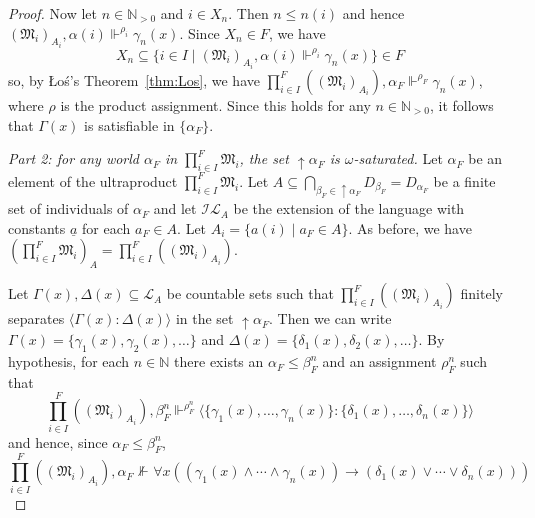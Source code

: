 \documentclass[submission,copyright,creativecommons]{eptcs}
\newcommand{\mo}{\mathfrak}
\newcommand{\IL}{\mathscr{I\!\!L}}   %
\newcommand{\LL}{\mathcal{L}}        %
\newcommand{\consec}[2]{\langle #1:#2 \rangle}
\newcommand{\satisfySym}{\Vdash}
\newcommand{\satisfy}[4]{#1, #2 \satisfySym^{#4} #3}
\newcommand{\notsatisfy}[4]{#1, #2 \not\Vdash^{#4} #3}
\begin{document}
\begin{proof}
  Now let $n \in \mathbb{N}_{>0}$ and $i \in X_n$. 
  Then $n \leq n(i)$ and hence
  $\satisfy{(\mo{M}_i)_{A_i}}{\alpha(i)}{\gamma_n(x)}{\rho_i}$. Since $X_n \in F$, we have 
  \begin{equation*}
    X_n \subseteq \{ i \in I \mid \satisfy{(\mo{M}_i)_{A_i}}{\alpha(i)}{\gamma_n(x)}{\rho_i} \}
        \in F
  \end{equation*}
  so, by \L{}o{\'s}'s Theorem~\ref{thm:Los}, we have
  $\satisfy{\prod_{i \in I}^F((\mo{M}_i)_{A_i})}{\alpha_F}{\gamma_n(x)}{\rho_F}$,
  where $\rho$ is the product assignment.
  Since this holds for any $n \in \mathbb{N}_{>0}$,
  it follows that $\Gamma(x)$ is satisfiable in $\{\alpha_F\}$.

\medskip\noindent
\textit{Part 2: for any world $\alpha_F$ in $\prod_{i \in I}^F\mo{M}_i$,
        the set ${\uparrow}\alpha_F$ is $\omega$-saturated.}
%
  Let $\alpha_F$ be an element of the ultraproduct $\prod_{i \in I}^F \mo{M}_i$.
  Let $A \subseteq \bigcap_{\beta_F \in {\uparrow}\alpha_F}D_{\beta_F} = D_{\alpha_F}$ be a finite set of individuals of $\alpha_F$
  and let $\IL_A$ be the extension of the language with constants
  $\underline{a}$ for each $a_F \in A$.
  Let $A_i = \{ a(i) \mid a_F \in A \}$.
  As before, we have $(\prod_{i \in I}^F\mo{M}_i)_A = \prod_{i \in I}^F((\mo{M}_i)_{A_i})$.

  Let $\Gamma(x),\Delta(x) \subseteq \LL_A$ be countable sets such that
  $\prod_{i \in I}^F((\mo{M}_i)_{A_i})$ finitely separates $\consec{\Gamma(x)}{\Delta(x)}$
  in the set ${\uparrow}\alpha_F$.
  Then we can write $\Gamma(x) = \{ \gamma_1(x), \gamma_2(x), \ldots \}$
  and $\Delta(x) = \{ \delta_1(x), \delta_2(x), \ldots \}$.
  By hypothesis, for each $n \in \mathbb{N}$ there exists an $\alpha_F \leq \beta^n_F$
  and an assignment $\rho_F^n$ such that
  \begin{equation*}
    \satisfy{\prod_{i \in I}^F((\mo{M}_i)_{A_i})}
            {\beta^n_F}
            {\consec{\{\gamma_1(x),\ldots,\gamma_n(x)\}}{\{\delta_1(x),\ldots,\delta_n(x)\}}}
            {\rho_F^n}
  \end{equation*}
  and hence, since $\alpha_F \leq \beta^n_F$,
  \begin{equation*}
    \notsatisfy{\prod_{i \in I}^F((\mo{M}_i)_{A_i})}
               {\alpha_F}
               {\forall x( (\gamma_1(x) \wedge \cdots \wedge \gamma_n(x)) \to (\delta_1(x) \vee \cdots \vee \delta_n(x)))}
               {}
  \end{equation*}


\end{proof}
\end{document}
